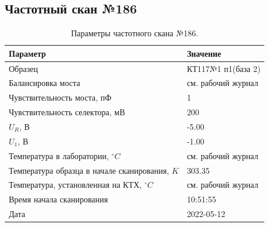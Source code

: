 \subsection{Частотный скан №186}
\begin{table}[!ht]
    \centering
    \caption{Параметры частотного скана №186.}
    \begin{tabular}{|l|l|}
        \hline
        Параметр                                       & Значение                  \\ \hline
        Образец                                        & КТ117№1 п1(база 2)        \\ \hline
        Балансировка моста                             & см. рабочий журнал        \\ \hline
        Чувствительность моста, пФ                     & 1                         \\ \hline
        Чувствительность селектора, мВ                 & 200                       \\ \hline
        $U_R$, В                                       & -5.00                     \\ \hline
        $U_1$, В                                       & -1.00                     \\ \hline
        Температура в лаборатории, $^\circ C$          & см. рабочий журнал        \\ \hline
        Температура образца в начале сканирования, $K$ & 303.35                    \\ \hline
        Температура, установленная на КТХ, $^\circ C$  & см. рабочий журнал        \\ \hline
        Время начала сканирования                      & 10:51:55                  \\ \hline
        Дата                                           & 2022-05-12                \\ \hline
    \end{tabular}
    \label{table:frequency_scan_186}
\end{table}

